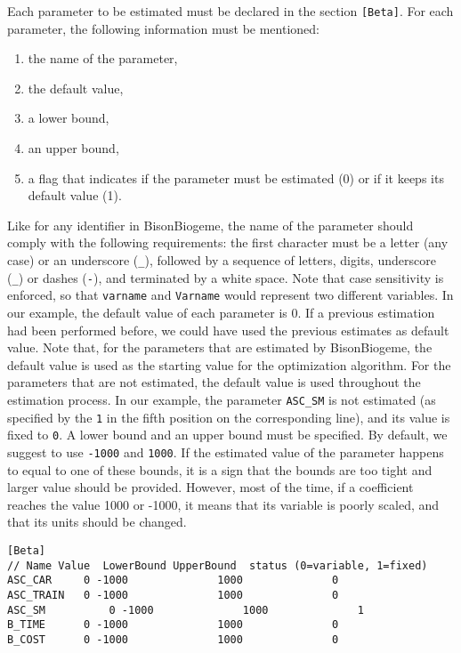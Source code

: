 \documentclass[12pt,a4paper]{article}
\newcommand{\BBIOGEME}{BisonBiogeme}
\begin{document}
Each parameter to be estimated must be declared in the section
\lstinline$[Beta]$. For each parameter, the following information must be mentioned:
\begin{enumerate}
\item the name of the parameter,
\item the default value,
\item a lower bound,
\item an upper bound,
\item a flag that indicates if the parameter must be estimated (0) or if it keeps its default value (1).
\end{enumerate}
Like for any identifier in \BBIOGEME, the name of the parameter should
comply with the following requirements:  the first character must be a letter
  (any case) or an underscore (\verb+_+), followed by a sequence of
  letters, digits, underscore (\verb+_+) or dashes (\verb+-+), and
  terminated by a white space. Note that case sensitivity is enforced, so that \verb+varname+ and \verb+Varname+ would represent two different variables.
In our example, the default value of each parameter is 0. If a
previous estimation had been performed before, we could have used the
previous estimates as default value. Note that, for the parameters
that are estimated by \BBIOGEME, the default value is used as the
starting value for the optimization algorithm. For the parameters that
are not estimated, the default value is used throughout the estimation
process. In our example, the parameter \lstinline$ASC_SM$ is not
estimated (as specified by the \lstinline$1$ in the fifth position on
the corresponding line), and its value is fixed to \lstinline$0$. 
A lower bound and an upper bound must be specified. By default, we
suggest to use \lstinline$-1000$ and \lstinline$1000$. If the
estimated value of the parameter happens to equal to one of these bounds, it
is a sign that the bounds are too tight and larger value should be
provided. However, most of the time, if a
coefficient reaches the value 1000 or -1000, it means that its
variable is poorly scaled, and that its units should be changed. 
\begin{lstlisting}[style=nonumbers]
[Beta]
// Name Value  LowerBound UpperBound  status (0=variable, 1=fixed)
ASC_CAR 	0 -1000              1000              0
ASC_TRAIN  	0 -1000              1000              0
ASC_SM	        0 -1000              1000              1
B_TIME		0 -1000              1000              0
B_COST		0 -1000              1000              0
\end{lstlisting}
\end{document}
